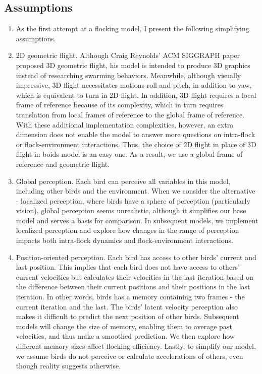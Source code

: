 \documentclass{article}
\begin{document}
\subsection{Assumptions}
  \begin{enumerate}
    \item [] As the first attempt at a flocking model, I present
      the following simplifying assumptions.

    \item 2D geometric flight. Although Craig Reynolds' ACM SIGGRAPH paper proposed
      3D geometric flight, his model is intended to produce 3D graphics instead
      of researching swarming behaviors. Meanwhile, although visually
      impressive, 3D flight necessitates motions roll and pitch, in addition to
      yaw, which is equivalent to turn in 2D flight. In addition, 3D flight
      requires a local frame of reference because of its complexity, which in
      turn requires translation from local frames of reference to the global
      frame of reference. With these additional implementation complexities,
      however, an extra dimension does not enable the model to answer
      more questions on intra-flock or flock-environment interactions. Thus,
      the choice of 2D flight in place of 3D flight in boids model is an
      easy one. As a result, we use a global frame of reference and geometric
      flight.

    \item Global perception. Each bird can perceive all variables in this
      model, including other birds and the environment. When we consider the
      alternative - localized perception, where birds have a sphere of
      perception (particularly vision), global perception seems unrealistic,
      although it simplifies our base model and serves a basis for comparison.
      In subsequent models, we implement localized perception and explore
      how changes in the range of perception impacts both intra-flock dynamics
      and flock-environment interactions.

    \item Position-oriented perception. Each bird has access to other birds'
      current and last position. This implies that each bird does not have
      access to others' current velocities but calculates their velocities
      in the last iteration based on the difference between their current
      positions and their positions in the last iteration. In other words,
      birds has a memory containing two frames - the current iteration and the
      last. The birds' latent velocity perception also makes it
      difficult to predict the next position of other birds. Subsequent models
      will change the size of memory, enabling them to average past velocities,
      and thus make a smoothed prediction. We then explore how different memory
      sizes affect flocking efficiency. Lastly, to simplify our model, we assume
      birds do not perceive or calculate accelerations of others, even though
      reality suggests otherwise.


\end{enumerate}
\end{document}
